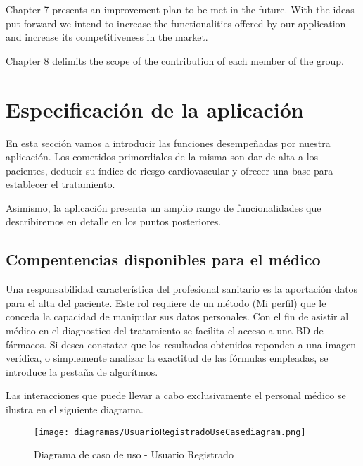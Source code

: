 \documentclass[11pt,spanish,
		listoftables,listoffigures]
		{tfgplantilla}
\begin{document}
Chapter 7 presents an improvement plan to be met in the future. With the ideas put forward we intend to increase the functionalities offered by our application and increase its competitiveness in the market.

Chapter 8 delimits the scope of the contribution of each member of the group.


\chapter{Especificación de la aplicaci\'on}

En esta sección vamos a introducir las funciones desempeñadas por nuestra aplicación. Los cometidos primordiales de la misma son dar de alta a los pacientes, deducir su índice de riesgo cardiovascular y ofrecer una base para establecer el tratamiento.

Asimismo, la aplicación presenta un amplio rango de funcionalidades que describiremos en detalle en los puntos posteriores.

\section {Compentencias disponibles para el médico}
Una responsabilidad característica del profesional sanitario es la aportación datos para el alta del paciente. Este rol requiere de un método (Mi perfil) que le conceda la capacidad de manipular sus datos personales.
Con el fin de asistir al médico en el diagnostico del tratamiento se facilita el acceso a una BD de fármacos. Si desea constatar que los resultados obtenidos reponden a una imagen verídica, o simplemente analizar la exactitud de las fórmulas empleadas, se introduce la pestaña de algorítmos.

Las interacciones que puede llevar a cabo exclusivamente el personal médico se ilustra en el siguiente diagrama.

\begin{figure}[H]
\centering
\texttt{[image: diagramas/UsuarioRegistradoUseCasediagram.png]}
\caption{Diagrama de caso de uso - Usuario Registrado}
\end{figure}
\end{document}
